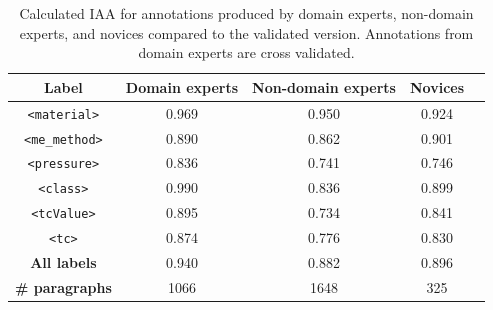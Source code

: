 \documentclass[fleqn,10pt]{wlscirep}
\begin{document}
\begin{table}[ht]
    \centering
    \begin{tabular}{ | c | c | c | c | c | } 
    \hline
        \textbf{Label} & \textbf{Domain experts} & \textbf{Non-domain experts} & \textbf{Novices}\\
    \hline
        \texttt{<material>}     &   0.969   & 0.950    &   0.924   \\
        \texttt{<me\_method>}   &   0.890   & 0.862    &   0.901   \\
        \texttt{<pressure>}     &   0.836   & 0.741    &   0.746   \\
        \texttt{<class>}        &   0.990   & 0.836	   &   0.899   \\
        \texttt{<tcValue>}      &   0.895   & 0.734	   &   0.841   \\
        \texttt{<tc>}           &   0.874   & 0.776	   &   0.830   \\
    \hline
        \textbf{All labels}        &	0.940   &   0.882	&      0.896   \\
    \hline
        \textbf{\# paragraphs}  &   1066   &  1648	    &   325     \\
    \hline
    \end{tabular}
    \caption{Calculated IAA for annotations produced by domain experts, non-domain experts, and novices compared to the validated version. Annotations from domain experts are cross validated. }
    \label{table:comparison-iaa-nde-de}
\end{table}
\end{document}

